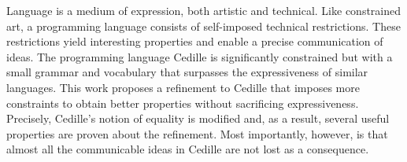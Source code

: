 \begin{publicAbstract}

Language is a medium of expression, both artistic and technical.
Like constrained art, a programming language consists of self-imposed technical restrictions.
These restrictions yield interesting properties and enable a precise communication of ideas.
The programming language Cedille is significantly constrained but with a small grammar and vocabulary that surpasses the expressiveness of similar languages.
This work proposes a refinement to Cedille that imposes more constraints to obtain better properties without sacrificing expressiveness.
Precisely, Cedille's notion of equality is modified and, as a result, several useful properties are proven about the refinement.
Most importantly, however, is that almost all the communicable ideas in Cedille are not lost as a consequence.

\end{publicAbstract}